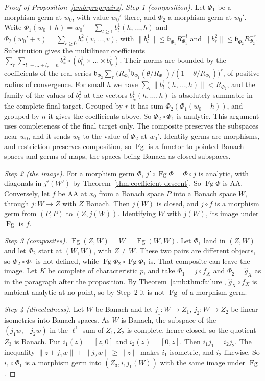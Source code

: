 \documentclass[11pt]{amsart}
\theoremstyle{definition}
\theoremstyle{remark}
\numberwithin{equation}{section}
\newcommand{\norm}[1]{\lVert #1\rVert}
\theoremstyle{plain}
\theoremstyle{definition}
\theoremstyle{plain}
\begin{document}
\begin{proof}[Proof of Proposition~\ref{amb:prop:pairs}]
\emph{Step 1 (composition).} Let $\Phi_1$ be a morphism germ at $w_0$, with value $w_0'$ there, and $\Phi_2$ a morphism germ at $w_0'$. Write $\Phi_1(w_0+h)=w_0'+\sum_{l\ge1}b^1_l(h,\dots,h)$ and $\Phi_2(w_0'+v)=\sum_{r\ge0}b^2_r(v,\dots,v)$, with $\norm{b^1_l}\le \mathfrak b_{\Phi_1}R_{\Phi_1}^{-l}$ and $\norm{b^2_r}\le \mathfrak b_{\Phi_2}R_{\Phi_2}^{-r}$. Substitution gives the multilinear coefficients $\sum_r\sum_{l_1+\dots+l_r=n}b^2_r\circ(b^1_{l_1}\times\dots\times b^1_{l_r})$. Their norms are bounded by the coefficients of the real series $\mathfrak b_{\Phi_2}\sum_r\bigl(R_{\Phi_2}^{-1}\mathfrak b_{\Phi_1}(\theta/R_{\Phi_1})/(1-\theta/R_{\Phi_1})\bigr)^r$, of positive radius of convergence. For small $h$ we have $\sum_l\norm{b^1_l(h,\dots,h)}<R_{\Phi_2}$, and the family of the values of $b^2_r$ at the vectors $b^1_{l_c}(h,\dots,h)$ is absolutely summable in the complete final target. Grouped by $r$ it has sum $\Phi_2(\Phi_1(w_0+h))$, and grouped by $n$ it gives the coefficients above. So $\Phi_2\circ\Phi_1$ is analytic. This argument uses completeness of the final target only. The composite preserves the subspaces near $w_0$, and it sends $w_0$ to the value of $\Phi_2$ at $w_0'$. Identity germs are morphisms, and restriction preserves composition, so $\operatorname{Fg}$ is a functor to pointed Banach spaces and germs of maps, the spaces being Banach as closed subspaces.

\emph{Step 2 (the image).} For a morphism germ $\Phi$, $j'\circ\operatorname{Fg}\Phi=\Phi\circ j$ is analytic, with diagonals in $j'(W')$ by Theorem~\ref{thm:coefficient-descent}. So $\operatorname{Fg}\Phi$ is AA. Conversely, let $f$ be AA at $x_0$ from a Banach space $P$ into a Banach space $W$, through $j\colon W\to Z$ with $Z$ Banach. Then $j(W)$ is closed, and $j\circ f$ is a morphism germ from $(P,P)$ to $(Z,j(W))$. Identifying $W$ with $j(W)$, its image under $\operatorname{Fg}$ is $f$.

\emph{Step 3 (composites).} $\operatorname{Fg}(Z,W)=W=\operatorname{Fg}(W,W)$. Let $\Phi_1$ land in $(Z,W)$ and let $\Phi_2$ start at $(W,W)$, with $Z\ne W$. These two pairs are different objects, so $\Phi_2\circ\Phi_1$ is not defined, while $\operatorname{Fg}\Phi_2\circ\operatorname{Fg}\Phi_1$ is. That composite can leave the image. Let $K$ be complete of characteristic $p$, and take $\Phi_1=j\circ f_X$ and $\Phi_2=\hat g_X$ as in the paragraph after the proposition. By Theorem~\ref{amb:thm:failure}, $\hat g_X\circ f_X$ is ambient analytic at no point, so by Step~2 it is not $\operatorname{Fg}$ of a morphism germ.

\emph{Step 4 (directedness).} Let $W$ be Banach and let $j_1\colon W\to Z_1$, $j_2\colon W\to Z_2$ be linear isometries into Banach spaces. As $W$ is Banach, the subspace of the $(j_1w,-j_2w)$ in the $\ell^1$-sum of $Z_1,Z_2$ is complete, hence closed, so the quotient $Z_3$ is Banach. Put $i_1(z)=[z,0]$ and $i_2(z)=[0,z]$. Then $i_1j_1=i_2j_2$. The inequality $\norm{z+j_1w}+\norm{j_2w}\ge\norm z$ makes $i_1$ isometric, and $i_2$ likewise. So $i_1\circ\Phi_1$ is a morphism germ into $(Z_3,i_1j_1(W))$ with the same image under $\operatorname{Fg}$.
\end{proof}
\end{document}
